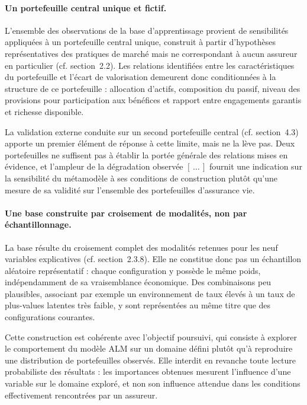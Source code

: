 \paragraph{Un portefeuille central unique et fictif.} L'ensemble des observations de la base d'apprentissage provient de sensibilités appliquées à un portefeuille central unique, construit à partir d'hypothèses représentatives des pratiques de marché mais ne correspondant à aucun assureur en particulier (cf. section~2.2). Les relations identifiées entre les caractéristiques du portefeuille et l'écart de valorisation demeurent donc conditionnées à la structure de ce portefeuille : allocation d'actifs, composition du passif, niveau des provisions pour participation aux bénéfices et rapport entre engagements garantis et richesse disponible.

La validation externe conduite sur un second portefeuille central (cf. section~4.3) apporte un premier élément de réponse à cette limite, mais ne la lève pas. Deux portefeuilles ne suffisent pas à établir la portée générale des relations mises en évidence, et l'ampleur de la dégradation observée \([\,\ldots\,]\) fournit une indication sur la sensibilité du métamodèle à ses conditions de construction plutôt qu'une mesure de sa validité sur l'ensemble des portefeuilles d'assurance vie.

\paragraph{Une base construite par croisement de modalités, non par échantillonnage.} La base résulte du croisement complet des modalités retenues pour les neuf variables explicatives (cf. section~2.3.8). Elle ne constitue donc pas un échantillon aléatoire représentatif : chaque configuration y possède le même poids, indépendamment de sa vraisemblance économique. Des combinaisons peu plausibles, associant par exemple un environnement de taux élevés à un taux de plus-values latentes très faible, y sont représentées au même titre que des configurations courantes.

Cette construction est cohérente avec l'objectif poursuivi, qui consiste à explorer le comportement du modèle ALM sur un domaine défini plutôt qu'à reproduire une distribution de portefeuilles observés. Elle interdit en revanche toute lecture probabiliste des résultats : les importances obtenues mesurent l'influence d'une variable sur le domaine exploré, et non son influence attendue dans les conditions effectivement rencontrées par un assureur.

